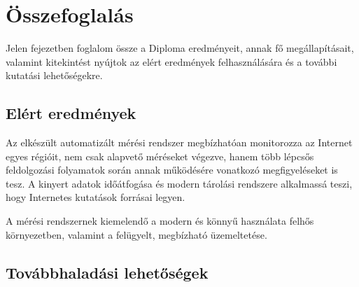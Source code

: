 \chapter{Összefoglalás}
Jelen fejezetben foglalom össze a Diploma eredményeit, annak fő megállapításait, valamint kitekintést nyújtok az elért eredmények felhasználására és a további kutatási lehetőségekre.

\section{Elért eredmények}

Az elkészült automatizált mérési rendszer megbízhatóan monitorozza az Internet egyes régióit, nem csak alapvető méréseket végezve, hanem több lépcsős feldolgozási folyamatok során annak működésére vonatkozó megfigyeléseket is tesz. A kinyert adatok időátfogása és modern tárolási rendszere alkalmassá teszi, hogy Internetes kutatások forrásai legyen. 

A mérési rendszernek kiemelendő a modern és könnyű használata felhős környezetben, valamint a felügyelt, megbízható üzemeltetése.



%


\section{Továbbhaladási lehetőségek}

